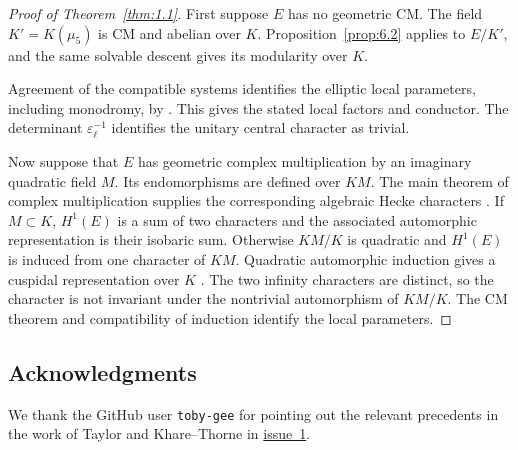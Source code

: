 \documentclass[11pt,a4paper]{article}
\numberwithin{equation}{section}
\begin{document}
\begin{proof}[Proof of Theorem~\ref{thm:1.1}]
First suppose \(E\) has no geometric CM. The field \(K'=K(\mu_5)\) is CM and abelian over \(K\). Proposition~\ref{prop:6.2} applies to \(E/K'\), and the same solvable descent gives its modularity over \(K\).

Agreement of the compatible systems identifies the elliptic local parameters, including monodromy, by \cite[Lemma~6.1.3]{CN}. This gives the stated local factors and conductor. The determinant \(\varepsilon_\ell^{-1}\) identifies the unitary central character as trivial.

Now suppose that \(E\) has geometric complex multiplication by an imaginary quadratic field \(M\). Its endomorphisms are defined over \(KM\). The main theorem of complex multiplication supplies the corresponding algebraic Hecke characters \cite[Chapter~II, \S\S9--10]{Si}. If \(M\subset K\), \(H^1(E)\) is a sum of two characters and the associated automorphic representation is their isobaric sum. Otherwise \(KM/K\) is quadratic and \(H^1(E)\) is induced from one character of \(KM\). Quadratic automorphic induction gives a cuspidal representation over \(K\) \cite{AC}. The two infinity characters are distinct, so the character is not invariant under the nontrivial automorphism of \(KM/K\). The CM theorem and compatibility of induction identify the local parameters.
\end{proof}

\clearpage
\subsection*{Acknowledgments}
We thank the GitHub user \texttt{toby-gee} for pointing out the relevant precedents in the work of Taylor and Khare--Thorne in \href{https://github.com/CaptainSude/elliptic-curves-cm-modularity/issues/1}{issue~1}.
\end{document}
